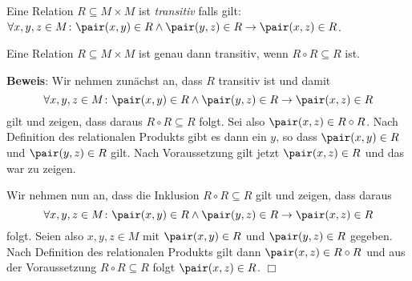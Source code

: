 \begin{Definition}
Eine Relation $R \subseteq M \times M$  ist \emph{transitiv} falls gilt: \\[0.2cm]
\hspace*{1.3cm} 
$\forall x, y, z \in M \colon \pair(x,y) \in R \wedge \pair(y,z) \in R \rightarrow \pair(x,z) \in
R$.
\end{Definition}

\begin{Satz}
Eine Relation $R \subseteq M \times M$  ist genau dann transitiv, wenn
$R \circ R \subseteq R$ ist.
\end{Satz}

\noindent
\textbf{Beweis}:  Wir nehmen zunächst an, dass $R$ transitiv ist und damit
\[ \forall x, y, z \in M \colon \pair(x,y) \in R \wedge \pair(y,z) \in R \rightarrow \pair(x,z) \in R \]
gilt und zeigen, dass daraus $R \circ R \subseteq R$ folgt.
Sei also $\pair(x,z) \in R \circ R$.  Nach Definition des relationalen Produkts gibt es
dann ein $y$, so dass $\pair(x,y) \in R$ und $\pair(y,z) \in R$ gilt.
Nach Voraussetzung gilt jetzt $\pair(x,z) \in R$ und das war zu zeigen.

Wir nehmen nun an, dass die Inklusion $R \circ R \subseteq R$ gilt und zeigen, dass daraus
\[ \forall x, y, z \in M \colon \pair(x,y) \in R \wedge \pair(y,z) \in R \rightarrow \pair(x,z) \in R \]
folgt.  Seien also $x,y,z \in M$ mit $\pair(x,y) \in R$ und $\pair(y,z) \in R$ gegeben.
Nach Definition des relationalen Produkts gilt dann $\pair(x,z) \in R \circ R$ und aus
der Voraussetzung $R \circ R \subseteq R$ folgt  $\pair(x,z) \in R$. \hspace*{\fill} $\Box$



